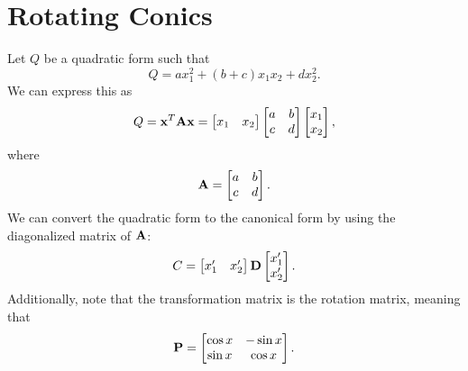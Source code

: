 \section{Rotating Conics}
Let $Q$ be a quadratic form such that $$Q = ax_{1}^2+(b+c)x_1x_2+dx_2^2.$$
We can express this as $$Q = \bold{x}^T \bold{A}\bold{x} = \begin{bmatrix} x_1 & x_2 \end{bmatrix} \begin{bmatrix} a & b \\ c & d \end{bmatrix}
\begin{bmatrix} x_1 \\ x_2 \end{bmatrix},$$ where $$\bold{A} = \begin{bmatrix} a & b \\ c & d \end{bmatrix}.$$
We can convert the quadratic form to the canonical form by using the diagonalized matrix of $\bold{A}$:
$$C = \begin{bmatrix} x_1' & x_2' \end{bmatrix} \bold{D}
\begin{bmatrix} x_1' \\ x_2' \end{bmatrix}.$$ Additionally, note that the transformation matrix is the
rotation matrix, meaning that
$$\bold{P} = \begin{bmatrix} \cos x & -\sin x \\ \sin x & \cos x\end{bmatrix}.$$

